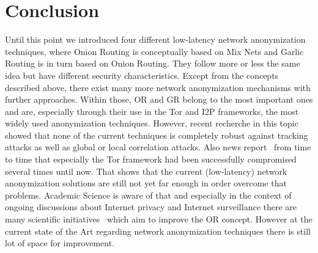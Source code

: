 \documentclass{sig-alternate}
\begin{document}
\section{Conclusion}
Until this point we introduced four different low-latency network anonymization techniques, where Onion Routing is conceptually based on Mix Nets and Garlic Routing is in turn based on Onion Routing. They follow more or less the same idea but have different security characteristics. Except from the concepts described above, there exist many more network anonymization mechanisms with further approaches. Within those, OR and GR belong to the most important ones and are, especially through their use in the Tor and I2P frameworks, the most widely used anonymization techniques. However, recent recherche in this topic showed that none of the current techniques is completely robust against tracking attacks as well as global or local correlation attacks. Also news report~\cite{torhacked} from time to time that especially the Tor framework had been successfully compromised several times until now. That shows that the current (low-latency) network anonymization solutions are still not yet far enough in order overcome that problems. Academic Science is aware of that and especially in the context of ongoing discussions about Internet privacy and Internet surveillance there are many scientific initiatives~\cite{ORpublications} which aim to improve the OR concept. However at the current state of the Art regarding network anonymization techniques there is still lot of space for improvement.



\end{document}
